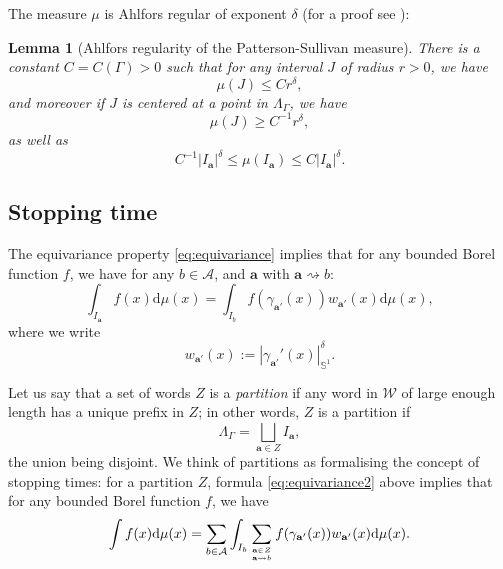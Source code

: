\documentclass[12pt]{amsart}
\newcommand*\abs[1]{
	\left|#1\right|
}
\newcommand*\deriv{
	\mathrm{d}
}
\newtheorem{lem}{Lemma}[section]
\theoremstyle{definition}
\renewcommand{\leq}{\leqslant}
\renewcommand{\geq}{\geqslant}
\begin{document}
The measure $\mu$ is Ahlfors regular of exponent $\delta$ (for a proof see \cite[lemma 2.11 and 2.12]{BD}):
\begin{lem}[Ahlfors regularity of the Patterson-Sullivan measure]
\label{lem:ahlfors-regularity}
There is a constant $C = C(\Gamma) >0$ such that for any interval $J$ of radius $r > 0$, we have
\[\mu(J) \leq Cr^\delta,\]
and moreover if $J$ is centered at a point in $\Lambda_\Gamma$, we have
\[\mu(J) \geq C^{-1}r^\delta,\]
as well as
\[C^{-1}\abs{I_\mathbf{a}}^\delta \leq \mu(I_\mathbf{a}) \leq C\abs{I_\mathbf{a}}^\delta.\]
\end{lem}

\subsection{Stopping time}
The equivariance property \eqref{eq:equivariance} implies that for any bounded Borel function $f$, we have for any $b \in \mathcal{A}$, and $\mathbf{a}$ with $\mathbf{a} \rightsquigarrow b$:
\begin{equation}
\int_{I_\mathbf{a}} f(x)\deriv\mu(x)
= \int_{I_b} f(\gamma_{\mathbf{a}'}(x))w_{\mathbf{a}'}(x)\deriv \mu(x),
\label{eq:equivariance2}
\end{equation}
where we write
\[w_{\mathbf{a}'}(x) := \abs{\gamma_{\mathbf{a}'}'(x)}_{\mathbb{S}^1}^\delta.\]

Let us say that a set of words $Z$ is a \emph{partition} if any word in $\mathcal{W}$ of large enough length has a unique prefix in $Z$; in other words, $Z$ is a partition if
\[\Lambda_\Gamma = \bigsqcup_{\mathbf{a} \in Z} I_{\mathbf{a}},\]
the union being disjoint. We think of partitions as formalising the concept of stopping times: for a partition $Z$, formula \eqref{eq:equivariance2} above implies that for any bounded Borel function $f$, we have
\[\int f(x)\deriv\mu(x) = \sum_{b \in \mathcal{A}} \int_{I_b} \sum_{\mathbf{a} \in Z \atop \mathbf{a} \rightsquigarrow b} f(\gamma_{\mathbf{a}'}(x))w_{\mathbf{a}'}(x)\deriv \mu(x).\]
\end{document}

